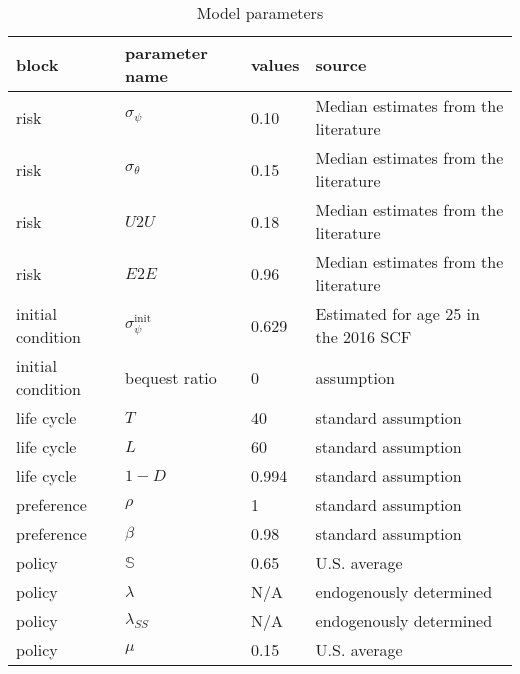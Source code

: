 \clearpage\begin{table}[p]
\begin{threeparttable}
\caption{Model parameters}
\label{tab:calibration}
\begin{tabular}{llll}
\hline 

block             & parameter name              & values & source                               \\
\hline 

risk              & $\sigma_\psi$               & 0.10   & Median estimates from the literature \\
risk              & $\sigma_\theta$             & 0.15    & Median estimates from the literature \\
risk              & $U2U$                       & 0.18   & Median estimates from the literature \\
risk              & $E2E$                       & 0.96   & Median estimates from the literature \\
\hline 

initial condition & $\sigma_\psi^{\text{init}}$ & 0.629  & Estimated for age 25 in the 2016 SCF \\
initial condition & bequest ratio               & 0      & assumption                           \\
\hline 

life cycle        & $T$                         & 40     & standard assumption                  \\
life cycle        & $L$                         & 60     & standard assumption                  \\
life cycle        & $1-D$                       & 0.994  & standard assumption                  \\
\hline 

preference        & $\rho$                      & 1      & standard assumption                  \\
preference        & $\beta$                     & 0.98   & standard assumption                  \\
\hline 

policy            & $\mathbb{S}$                & 0.65   & U.S. average                         \\
policy            & $\lambda$                   & N/A      & endogenously determined              \\
policy            & $\lambda_{SS}$              & N/A      & endogenously determined              \\
policy            & $\mu$                       & 0.15   & U.S. average                         \\
\hline 


\end{tabular}
\end{threeparttable}
\end{table}
